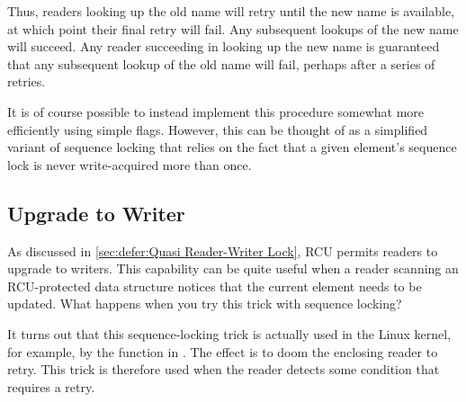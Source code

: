 Thus, readers looking up the old name will retry until the new name
is available, at which point their final retry will fail.
Any subsequent lookups of the new name will succeed.
Any reader succeeding in looking up the new name is guaranteed that
any subsequent lookup of the old name will fail, perhaps after a series
of retries.

\QuickQuizEnd

\QuickQuizEnd

It is of course possible to instead implement this procedure somewhat
more efficiently using simple flags.
However, this can be thought of as a simplified variant of sequence
locking that relies on the fact that a given element's sequence lock is
never write-acquired more than once.


\subsection{Upgrade to Writer}
\label{sec:together:Upgrade to Writer}

As discussed in
\cref{sec:defer:Quasi Reader-Writer Lock},
RCU permits readers to upgrade to writers.
This capability can be quite useful when a reader scanning an
RCU-protected data structure notices that the current element
needs to be updated.
What happens when you try this trick with sequence locking?

It turns out that this sequence-locking trick is actually used in
the Linux kernel, for example, by the  function in
.
The effect is to doom the enclosing reader to retry.
This trick is therefore used when the reader detects some condition
that requires a retry.
